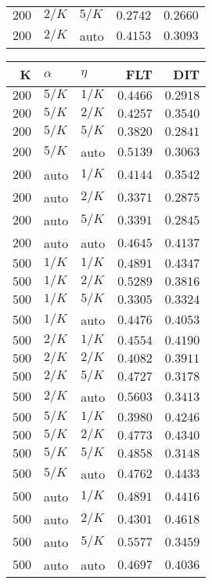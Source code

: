 \begin{table}
\begin{spacing}{1.2}
{\begin{tabular}{rll|rr}
$200$ &  $2/K$ &  $5/K$ &         $0.2742$ & $0.2660$ \\
$200$ &  $2/K$ &   auto &         $0.4153$ & $0.3093$ \\
\bottomrule
\end{tabular}
} \hfill \parbox{.45\linewidth}{\centering \begin{tabular}{rll|rr}
\toprule
    K &  $\alpha$ &    $\eta$ & FLT &        DIT \\
\midrule
$200$ &  $5/K$ &  $1/K$ &         $0.4466$ &      $0.2918$ \\
$200$ &  $5/K$ &  $2/K$ &         $0.4257$ &      $0.3540$ \\
$200$ &  $5/K$ &  $5/K$ &         $0.3820$ &      $0.2841$ \\
$200$ &  $5/K$ &   auto &         $0.5139$ &      $0.3063$ \\
$200$ &   auto &  $1/K$ &         $0.4144$ &      $0.3542$ \\
$200$ &   auto &  $2/K$ &         $0.3371$ &      $0.2875$ \\
$200$ &   auto &  $5/K$ &         $0.3391$ &      $0.2845$ \\
$200$ &   auto &   auto &         $0.4645$ &      $0.4137$ \\
$500$ &  $1/K$ &  $1/K$ &         $0.4891$ &      $0.4347$ \\
$500$ &  $1/K$ &  $2/K$ &         $0.5289$ &      $0.3816$ \\
$500$ &  $1/K$ &  $5/K$ &         $0.3305$ &      $0.3324$ \\
$500$ &  $1/K$ &   auto &         $0.4476$ &      $0.4053$ \\
$500$ &  $2/K$ &  $1/K$ &         $0.4554$ &      $0.4190$ \\
$500$ &  $2/K$ &  $2/K$ &         $0.4082$ &      $0.3911$ \\
$500$ &  $2/K$ &  $5/K$ &         $0.4727$ &      $0.3178$ \\
$500$ &  $2/K$ &   auto &    $\bm{0.5603}$ &      $0.3413$ \\
$500$ &  $5/K$ &  $1/K$ &         $0.3980$ &      $0.4246$ \\
$500$ &  $5/K$ &  $2/K$ &         $0.4773$ &      $0.4340$ \\
$500$ &  $5/K$ &  $5/K$ &         $0.4858$ &      $0.3148$ \\
$500$ &  $5/K$ &   auto &         $0.4762$ &      $0.4433$ \\
$500$ &   auto &  $1/K$ &         $0.4891$ &      $0.4416$ \\
$500$ &   auto &  $2/K$ &         $0.4301$ & $\bm{0.4618}$ \\
$500$ &   auto &  $5/K$ &         $0.5577$ &      $0.3459$ \\
$500$ &   auto &   auto &         $0.4697$ &      $0.4036$ \\
\bottomrule
\end{tabular}
}
\end{spacing}
\end{table}
